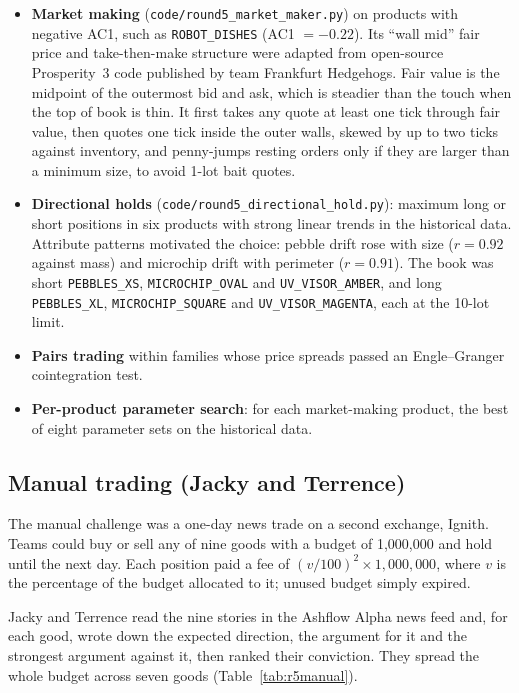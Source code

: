 \documentclass[11pt,a4paper]{article}
\newcommand{\pname}[1]{\texttt{#1}}
\begin{document}
\begin{itemize}\setlength\itemsep{0.1em}
\item \textbf{Market making} (\texttt{code/round5\_market\_maker.py}) on products with negative AC1, such as
\pname{ROBOT\_DISHES} (AC1 $=-0.22$). Its ``wall mid'' fair price and take-then-make structure were adapted
from open-source Prosperity~3 code published by team Frankfurt Hedgehogs. Fair value is the midpoint of the
outermost bid and ask, which is steadier than the touch when the top of book is thin. It first takes any quote at
least one tick through fair value, then quotes one tick inside the outer walls, skewed by up to two ticks against
inventory, and penny-jumps resting orders only if they are larger than a minimum size, to avoid 1-lot bait
quotes.
\item \textbf{Directional holds} (\texttt{code/round5\_directional\_hold.py}): maximum long or short positions
in six products with strong linear trends in the historical data. Attribute patterns motivated the choice:
pebble drift rose with size ($r=0.92$ against mass) and microchip drift with perimeter ($r=0.91$). The book
was short \pname{PEBBLES\_XS}, \pname{MICROCHIP\_OVAL} and \pname{UV\_VISOR\_AMBER}, and long
\pname{PEBBLES\_XL}, \pname{MICROCHIP\_SQUARE} and \pname{UV\_VISOR\_MAGENTA}, each at the 10-lot limit.
\item \textbf{Pairs trading} within families whose price spreads passed an Engle--Granger cointegration test.
\item \textbf{Per-product parameter search}: for each market-making product, the best of eight parameter sets
on the historical data.
\end{itemize}



\FloatBarrier
\subsection{Manual trading (Jacky and Terrence)}
The manual challenge was a one-day news trade on a second exchange, Ignith. Teams could buy or sell any of nine
goods with a budget of 1,000,000 and hold until the next day. Each position paid a fee of
$(v/100)^2\times1{,}000{,}000$, where $v$ is the percentage of the budget allocated to it; unused budget simply
expired.

Jacky and Terrence read the nine stories in the Ashflow Alpha news feed and, for each good, wrote down the
expected direction, the argument for it and the strongest argument against it, then ranked their conviction.
They spread the whole budget across seven goods (Table~\ref{tab:r5manual}).
\end{document}
